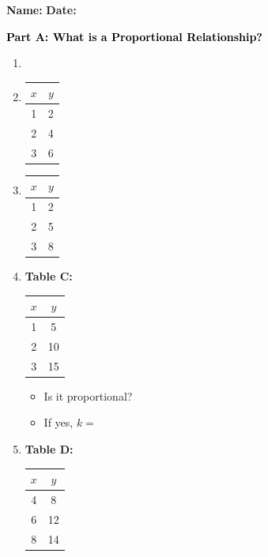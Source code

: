 \documentclass[12pt, letterpaper, fleqn]{article}
\newcommand{\blank}{\underline{\hspace{2.2cm}}}
\begin{document}
\textbf{Name:} \underline{\hspace{5cm}}
\hfill
\textbf{Date:} \underline{\hspace{3cm}}\\

\begin{tcolorbox}[colback=customteal!20]
\large\textcolor{black}{\textbf{Part A: What is a Proportional Relationship?}}
\end{tcolorbox}

\vspace{3mm}

\begin{enumerate}[itemsep=2.2cm, leftmargin=0.6cm]
\item [label=\Alph*.]
\item \begin{tabular}{|c|c|}
\hline
$x$ & $y$\\
\hline
1 & 2\\
2 & 4\\
3 & 6\\
\hline
\end{tabular}

\vspace{2mm}
\item \begin{tabular}{|c|c|}
\hline
$x$ & $y$\\
\hline
1 & 2\\
2 & 5\\
3 & 8\\
\hline
\end{tabular}
\item \textbf{Table C:}
\begin{tabular}{|c|c|}
\hline
$x$ & $y$ \\
\hline
1 & 5 \\
2 & 10 \\
3 & 15 \\
\hline
\end{tabular}

\begin{itemize}
\item Is it proportional? \blank
\item If yes, $k = $ \blank
\end{itemize}
\item \textbf{Table D:}
\begin{tabular}{|c|c|}
\hline
$x$ & $y$ \\
\hline
4 & 8 \\
6 & 12 \\
8 & 14 \\
\hline
\end{tabular}

\end{enumerate}
\end{document}
